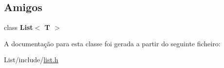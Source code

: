 \subsection*{Amigos}
\begin{DoxyCompactItemize}
\item 
class {\bfseries List$<$ T $>$}\hypertarget{class_list_1_1const__iterator_adfa51a0eca1eba953f68ca3f65cdaa05}{}\label{class_list_1_1const__iterator_adfa51a0eca1eba953f68ca3f65cdaa05}

\end{DoxyCompactItemize}


A documentação para esta classe foi gerada a partir do seguinte ficheiro\+:\begin{DoxyCompactItemize}
\item 
List/include/\hyperlink{list_8h}{list.\+h}\end{DoxyCompactItemize}
